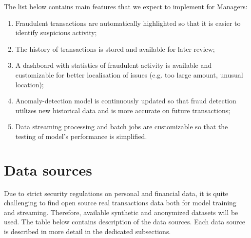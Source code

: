\documentclass[12pt,a4paper, hidelinks]{article}
\begin{document}
The list below contains main features that we expect to implement for Managers:
\begin{enumerate}
    \item Fraudulent transactions are automatically highlighted so that it is easier to identify suspicious activity;
    \item The history of transactions is stored and available for later review;
    \item A dashboard with statistics of fraudulent activity is available and customizable for better localisation of issues (e.g. too large amount, unusual location);
    \item Anomaly-detection model is continuously updated so that fraud detection utilizes new historical data and is more accurate on future transactions;
    \item Data streaming processing and batch jobs are customizable so that the testing of model's performance is simplified.
\end{enumerate}


\newpage

\section{Data sources}

Due to strict security regulations on personal and financial data, it is quite challenging to find open source real transactions data both for model training and streaming. Therefore, available synthetic and anonymized datasets will be used. The table below contains description of the data sources. Each data source is described in more detail in the dedicated subsections.
\end{document}
